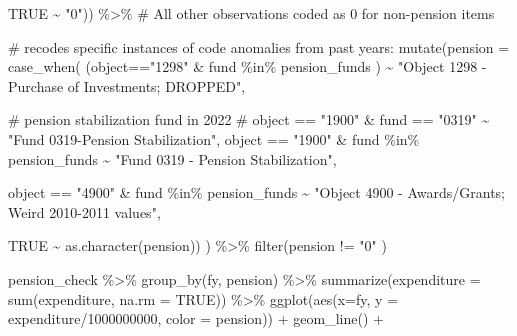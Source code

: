 \documentclass[
  letterpaper,
  DIV=11,
  numbers=noendperiod]{scrreport}
\newenvironment{Shaded}{\begin{snugshade}}{\end{snugshade}}
\newcommand{\AttributeTok}[1]{\textcolor[rgb]{0.40,0.45,0.13}{#1}}
\newcommand{\CommentTok}[1]{\textcolor[rgb]{0.37,0.37,0.37}{#1}}
\newcommand{\ConstantTok}[1]{\textcolor[rgb]{0.56,0.35,0.01}{#1}}
\newcommand{\DecValTok}[1]{\textcolor[rgb]{0.68,0.00,0.00}{#1}}
\newcommand{\FunctionTok}[1]{\textcolor[rgb]{0.28,0.35,0.67}{#1}}
\newcommand{\NormalTok}[1]{\textcolor[rgb]{0.00,0.23,0.31}{#1}}
\newcommand{\SpecialCharTok}[1]{\textcolor[rgb]{0.37,0.37,0.37}{#1}}
\newcommand{\StringTok}[1]{\textcolor[rgb]{0.13,0.47,0.30}{#1}}
\begin{document}
\begin{Shaded}
\begin{Highlighting}[]
            \ConstantTok{TRUE} \SpecialCharTok{\textasciitilde{}} \StringTok{"0"}\NormalTok{)) }\SpecialCharTok{\%\textgreater{}\%}  \CommentTok{\# All other observations coded as 0 for non{-}pension items}
  
  \CommentTok{\# recodes specific instances of code anomalies from past years:}
  \FunctionTok{mutate}\NormalTok{(}\AttributeTok{pension =} \FunctionTok{case\_when}\NormalTok{(}
\NormalTok{    (object}\SpecialCharTok{==}\StringTok{"1298"} \SpecialCharTok{\&}\NormalTok{ fund }\SpecialCharTok{\%in\%}\NormalTok{ pension\_funds ) }\SpecialCharTok{\textasciitilde{}} \StringTok{"Object 1298 {-} Purchase of Investments; DROPPED"}\NormalTok{, }

    
      \CommentTok{\# pension stabilization fund in 2022 }
 \CommentTok{\# object == "1900" \& fund == "0319" \textasciitilde{} "Fund 0319{-}Pension Stabilization", }
\NormalTok{    object }\SpecialCharTok{==} \StringTok{"1900"} \SpecialCharTok{\&}\NormalTok{ fund }\SpecialCharTok{\%in\%}\NormalTok{ pension\_funds }\SpecialCharTok{\textasciitilde{}} \StringTok{"Fund 0319 {-} Pension Stabilization"}\NormalTok{, }

  
\NormalTok{  object }\SpecialCharTok{==} \StringTok{"4900"} \SpecialCharTok{\&}\NormalTok{ fund }\SpecialCharTok{\%in\%}\NormalTok{ pension\_funds }\SpecialCharTok{\textasciitilde{}} \StringTok{"Object 4900 {-} Awards/Grants; Weird 2010{-}2011 values"}\NormalTok{,}
  
    \ConstantTok{TRUE} \SpecialCharTok{\textasciitilde{}} \FunctionTok{as.character}\NormalTok{(pension)) ) }\SpecialCharTok{\%\textgreater{}\%} 
  \FunctionTok{filter}\NormalTok{(pension }\SpecialCharTok{!=} \StringTok{"0"}\NormalTok{ )}

\NormalTok{pension\_check }\SpecialCharTok{\%\textgreater{}\%} \FunctionTok{group\_by}\NormalTok{(fy, pension) }\SpecialCharTok{\%\textgreater{}\%} 
  \FunctionTok{summarize}\NormalTok{(}\AttributeTok{expenditure =} \FunctionTok{sum}\NormalTok{(expenditure, }\AttributeTok{na.rm =} \ConstantTok{TRUE}\NormalTok{)) }\SpecialCharTok{\%\textgreater{}\%}
  \FunctionTok{ggplot}\NormalTok{(}\FunctionTok{aes}\NormalTok{(}\AttributeTok{x=}\NormalTok{fy, }\AttributeTok{y =}\NormalTok{ expenditure}\SpecialCharTok{/}\DecValTok{1000000000}\NormalTok{, }\AttributeTok{color =}\NormalTok{ pension)) }\SpecialCharTok{+} 
  \FunctionTok{geom\_line}\NormalTok{() }\SpecialCharTok{+} 


\end{Highlighting}
\end{Shaded}
\end{document}
